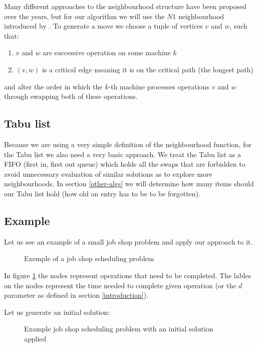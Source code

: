 \documentclass[14pt]{article}
\begin{document}
Many different approaches to the neighbourhood structure have been proposed over the years, but for our algorithm we will use the $N1$ neighbourhood introduced by \citet[section 3.3]{laarhoven}.
To generate a move we choose a tuple of vertices $v$ and $w$, such that:
\begin{enumerate}
  \item $v$ and $w$ are successive operation on some machine $k$
  \item $(v,w)$ is a critical edge meaning it is on the critical path (the longest path)
\end{enumerate}
and alter the order in which the $k$-th machine processes operations $v$ and $w$ through swapping both of these operations.

\subsection{Tabu list}

Because we are using a very simple definition of the neighbourhood function, for the Tabu list we also need a very basic approach. We treat the Tabu list as a FIFO (first in, first out queue) which holds all the swaps that are forbidden to avoid unnecessary evaluation of similar solutions as to explore more neighbourhoods. In section \ref{other-algs} we will determine how many items should our Tabu list hold (how old an entry has to be to be forgotten).

\subsection{Example}

Let us see an example of a small job shop problem and apply our approach to it.

\begin{figure}[H]
  \centering
  \def\svgwidth{0.5\columnwidth}
  
  \caption{Exemple of a job shop scheduling problem}
  \label{ts-sol-1}
\end{figure}

In figure \ref{ts-sol-1} the nodes represent operations that need to be completed. The lables on the nodes represent the time needed to complete given operation (or the $d$ parameter as defined in section \ref{introduction}).

Let us generate an initial solution:

\begin{figure}[H]
  \centering
  \def\svgwidth{0.5\columnwidth}
  
  \caption{Example job shop scheduling problem with an initial solution applied}
  \label{ts-sol-2}
\end{figure}
\end{document}
